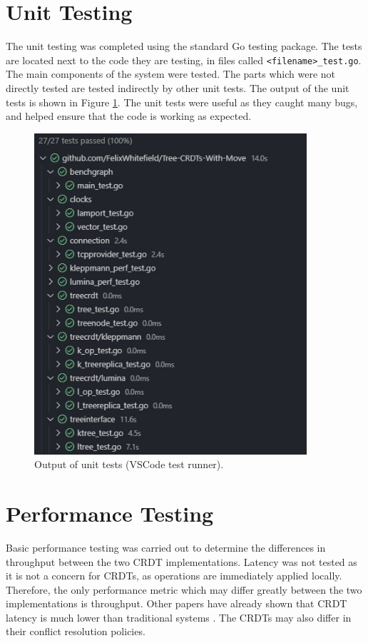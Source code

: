 \documentclass[12pt]{report}
\begin{document}
\section{Unit Testing}
The unit testing was completed using the standard Go testing package. The tests are located next to the code they are testing, in files called \texttt{<filename>\_test.go}. The main components of the system were tested. The parts which were not directly tested are tested indirectly by other unit tests. The output of the unit tests is shown in Figure \ref{fig:testing}. The unit tests were useful as they caught many bugs, and helped ensure that the code is working as expected. \par

\begin{figure}[H]
    \centering
    \includegraphics[width=0.9\textwidth]{images/tests_vs.jpg} 
    \caption{Output of unit tests (VSCode test runner).}
    \label{fig:testing}
\end{figure}

\section{Performance Testing}
Basic performance testing was carried out to determine the differences in throughput between the two CRDT implementations. Latency was not tested as it is not a concern for CRDTs, as operations are immediately applied locally. Therefore, the only performance metric which may differ greatly between the two implementations is throughput. Other papers have already shown that CRDT latency is much lower than traditional systems \cite{https://doi.org/10.48550/arxiv.2103.04828}. The CRDTs may also differ in their conflict resolution policies. \par
\end{document}
